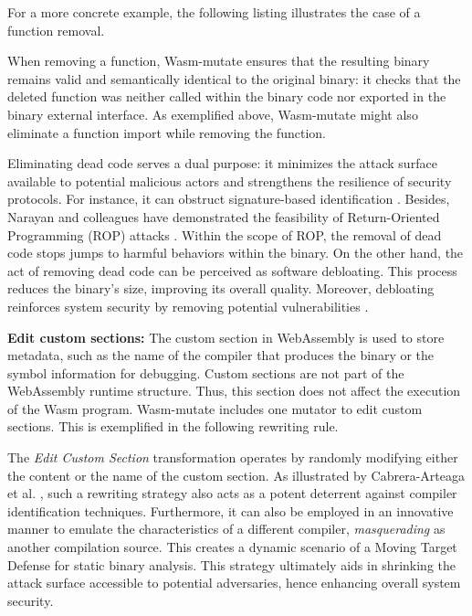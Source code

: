 \documentclass[sigplan,screen]{acmart}
\newcommand*\badge[1]{ \colorbox{red}{\color{white}#1}}
\newcommand{\tool}{Wasm-mutate\xspace}
\newcommand{\todo}[1]{%
\refstepcounter{todo}
\noindent\textbf{\badge{TODO}} {\color{red}#1}
\addcontentsline{td}{todo}
{\color{red}\thesection.\thetodo\xspace #1}}
\begin{document}
For a more concrete example, the following listing illustrates the case of a function removal.



When removing a function, \tool ensures that the resulting binary remains valid and semantically identical to the original binary: it checks  that the deleted function was neither called within the binary code nor exported in the binary external interface. 
As exemplified above, \tool might also eliminate a function import while removing the function. 


Eliminating dead code serves a dual purpose: it minimizes the attack surface available to potential malicious actors and strengthens the resilience of security protocols. 
For instance, it can obstruct signature-based identification \cite{CABRERAARTEAGA2023103296}.
Besides, Narayan and colleagues have demonstrated the feasibility of Return-Oriented Programming (ROP) attacks \cite{Swivel}.
Within the scope of ROP, the removal of dead code stops jumps to harmful behaviors within the binary. 
On the other hand, the act of removing dead code can be perceived as software debloating. 
This process reduces the binary's size, improving its overall quality. 
Moreover, debloating reinforces system security by removing potential vulnerabilities \cite{236200}.


\textbf{Edit custom sections:}
The custom section in WebAssembly is used to store metadata, such as the name of the compiler that produces the binary or the symbol information for debugging.
Custom sections are not part of the WebAssembly runtime structure.
Thus, this section does not affect the execution of the Wasm program.
\tool includes one mutator to edit custom sections. 
This is exemplified in the following rewriting rule. 



The \emph{Edit Custom Section} transformation operates by randomly modifying either the content or the name of the custom section. 
As illustrated by Cabrera-Arteaga et al. \cite{CABRERAARTEAGA2023103296}, such a rewriting strategy also acts as a potent deterrent against compiler identification techniques.
Furthermore, it can also be employed in an innovative manner to emulate the characteristics of a different compiler, \emph{masquerading} as another compilation source. 
This creates a dynamic scenario of a Moving Target Defense for static binary analysis. 
This strategy ultimately aids in shrinking the attack surface accessible to potential adversaries, hence enhancing overall system security.
\end{document}
